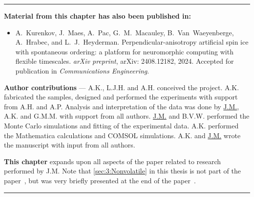 \newpage
\vspace*{\fill}
\begin{adjustwidth}{2em}{2em} %
	\vspace{0em}
	\begin{center}
		\centering\rule{0.75\linewidth}{0.4pt}
	\end{center}
	\vspace{0em}
	\begin{center}
		\textbf{Material from this chapter has also been published in:} \\
	\end{center}
	\vspace{0em} %
	\begin{adjustwidth}{0em}{1.5em}
		\begin{itemize}
			\item[\cite{KUR-24}] A.~Kurenkov, J.~Maes, A.~Pac, G.~M.~Macauley, B.~Van~Wae\-yenberge, A.~Hrabec, and L.~J.~Heyderman.
			\newblock Perpendicular-anisotropy artificial spin ice with spontaneous ordering: a platform for neuromorphic computing with flexible timescales.
			\newblock \emph{arXiv preprint}, arXiv: 2408.12182, 2024.
			\newblock Accepted for publication in \emph{Communications Engineering}.
		\end{itemize}
	\end{adjustwidth}
	\vspace{1em}
	\begin{adjustwidth}{0.125\linewidth}{0.125\linewidth}
		\textbf{Author contributions} ---
		A.K., L.J.H. and A.H. conceived the project. A.K. fabricated the samples, designed and performed the experiments with support from A.H. and A.P. Analysis and interpretation of the data was done by \underline{J.M.}, A.K. and G.M.M. with support from all authors. \underline{J.M.} and B.V.W. performed the Monte Carlo simulations and fitting of the experimental data. A.K. performed the Mathematica calculations and COMSOL simulations. A.K. and \underline{J.M.} wrote the manuscript with input from all authors. \par
		\vspace{1em}
		\textbf{This chapter} expands upon all aspects of the paper related to research performed by J.M.
		Note that \cref{sec:3:Nonvolatile} in this thesis is not part of the paper~\cite{KUR-24}, but was very briefly presented at the end of the \hotspice paper~\cite{MAES-24}.
	\end{adjustwidth}
	
	\vspace{-0.5em}
	\begin{center}
		\centering\rule{0.75\linewidth}{0.4pt}
	\end{center}
\end{adjustwidth}
\vspace*{\fill}

